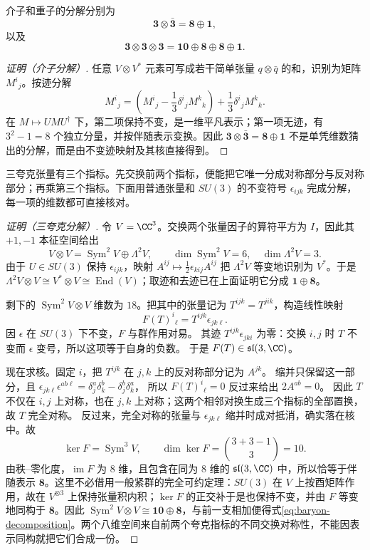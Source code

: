 \begin{proposition}[介子和重子的张量分解]
介子和重子的分解分别为
\[
\mathbf3\otimes\bar{\mathbf3}=\mathbf8\oplus\mathbf1,
\]
以及
\begin{equation}
\mathbf3\otimes\mathbf3\otimes\mathbf3
=\mathbf{10}\oplus\mathbf8\oplus\mathbf8\oplus\mathbf1.
\label{eq:baryon-decomposition}
\end{equation}
\end{proposition}
\begin{proof}[证明（介子分解）]
任意 $V\otimes V^*$ 元素可写成若干简单张量 $q\otimes\bar q$ 的和，识别为矩阵 $M^i{}_j$。按迹分解
\[
M^i{}_j=\left(M^i{}_j-\frac13\delta^i{}_j M^k{}_k\right)
+\frac13\delta^i{}_j M^k{}_k .
\]
在 $M\mapsto U M U^\dagger$ 下，第二项保持不变，是一维平凡表示；第一项无迹，有 $3^2-1=8$ 个独立分量，并按伴随表示变换。因此
\(\mathbf3\otimes\bar{\mathbf3}=\mathbf8\oplus\mathbf1\) 不是单凭维数猜出的分解，而是由不变迹映射及其核直接得到。
\end{proof}

三夸克张量有三个指标。先交换前两个指标，便能把它唯一分成对称部分与反对称部分；再乘第三个指标。下面用普通张量和 $SU(3)$ 的不变符号 $\epsilon_{ijk}$ 完成分解，每一项的维数都可直接核对。

\begin{proof}[证明（三夸克分解）]
令 $V=\CC^3$。交换两个张量因子的算符平方为 $I$，因此其 $+1,-1$ 本征空间给出
\[
V\otimes V=\operatorname{Sym}^2V\oplus\Lambda^2V,
\qquad \dim\operatorname{Sym}^2V=6,\quad\dim\Lambda^2V=3.
\]
由于 $U\in SU(3)$ 保持 $\epsilon_{ijk}$，映射
$A^{ij}\mapsto\tfrac12\epsilon_{kij}A^{ij}$ 把 $\Lambda^2V$ 等变地识别为 $V^*$。于是
$\Lambda^2V\otimes V\cong V^*\otimes V\cong\operatorname{End}(V)$；取迹和去迹已在上面证明它分成 $\mathbf1\oplus\mathbf8$。

剩下的 $\operatorname{Sym}^2V\otimes V$ 维数为 $18$。把其中的张量记为 $T^{ijk}=T^{jik}$，构造线性映射
\[
F(T)^i{}_{\ell}=T^{ijk}\epsilon_{jk\ell}.
\]
因 $\epsilon$ 在 $SU(3)$ 下不变，$F$ 与群作用对易。
其迹 $T^{ijk}\epsilon_{jki}$ 为零：交换 $i,j$ 时 $T$ 不变而 $\epsilon$ 变号，所以这项等于自身的负数。
于是 $F(T)\in\mathfrak{sl}(3,\CC)$。

现在求核。固定 $i$，把 $T^{ijk}$ 在 $j,k$ 上的反对称部分记为 $A^{jk}$。
缩并只保留这一部分，且 $\epsilon_{jk\ell}\epsilon^{ab\ell}=\delta_j^a\delta_k^b-\delta_j^b\delta_k^a$，
所以 $F(T)^i{}_{\ell}=0$ 反过来给出 $2A^{ab}=0$。
因此 $T$ 不仅在 $i,j$ 上对称，也在 $j,k$ 上对称；这两个相邻对换生成三个指标的全部置换，故 $T$ 完全对称。
反过来，完全对称的张量与 $\epsilon_{jk\ell}$ 缩并时成对抵消，确实落在核中。故
\[
\ker F=\operatorname{Sym}^3V,
\qquad \dim\ker F=\binom{3+3-1}{3}=10.
\]
由秩--零化度，$\operatorname{im}F$ 为 $8$ 维，且包含在同为 $8$ 维的 $\mathfrak{sl}(3,\CC)$ 中，所以恰等于伴随表示 $\mathbf8$。这里不必借用一般紧群的完全可约定理：$SU(3)$ 在 $V$ 上按酉矩阵作用，故在 $V^{\otimes3}$ 上保持张量积内积；$\ker F$ 的正交补于是也保持不变，并由 $F$ 等变地同构于 $\mathbf8$。因此 $\operatorname{Sym}^2V\otimes V\cong\mathbf{10}\oplus\mathbf8$，与前一支相加便得式\cref{eq:baryon-decomposition}。两个八维空间来自前两个夸克指标的不同交换对称性，不能因表示同构就把它们合成一份。
\end{proof}


